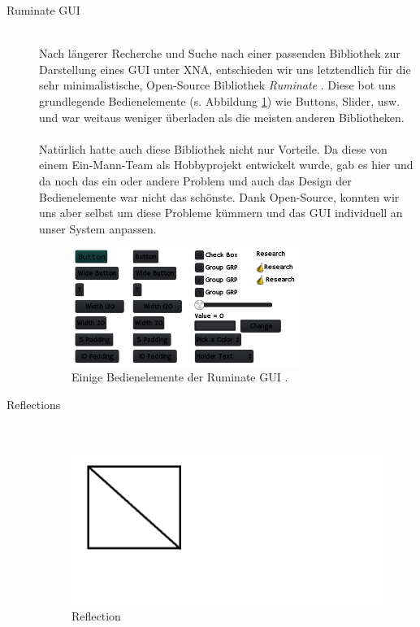 \begin{Spacing}{\mylinespace}
\begin{description}
	\item[Ruminate GUI] \hfill \\
	Nach längerer Recherche und Suche nach einer passenden Bibliothek zur Darstellung eines GUI unter XNA, entschieden wir uns letztendlich für die sehr minimalistische, Open-Source Bibliothek \textit{Ruminate} \cite{Franks2013}. Diese bot uns grundlegende Bedienelemente (s. Abbildung \ref{fig:Ruminate}) wie Buttons, Slider, usw. und war weitaus weniger überladen als die meisten anderen Bibliotheken.
\\\\
Natürlich hatte auch diese Bibliothek nicht nur Vorteile. Da diese von einem Ein-Mann-Team als Hobbyprojekt entwickelt wurde, gab es hier und da noch das ein oder andere Problem und auch das Design der Bedienelemente war nicht das schönste. Dank Open-Source, konnten wir uns aber selbst um diese Probleme kümmern und das GUI individuell an unser System anpassen.
	
\begin{figure}[h!]
	\centering
	\vspace*{20px}
	\includegraphics[width=280px]{graphics/ruminate.png}	
	\caption{Einige Bedienelemente der Ruminate GUI \cite{Franks2013}.}
	\label{fig:Ruminate}
\end{figure}
	
	\item[Reflections] \hfill \\
	
\begin{figure}[h!]
	\vspace*{30px}
	\includegraphics[width=\columnwidth]{graphics/reflection.png}	
	\caption{Reflection}
	\label{fig:Reflection}
\end{figure}
	

\end{description}
\end{Spacing}
